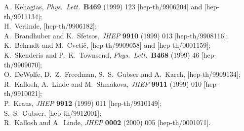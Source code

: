 \documentclass[a4paper,12pt]{article}
\begin{document}
\begin{thebibliography}{99}
%
A.~Kehagias,
{\it Phys.\ Lett.}\  {\bf B469} (1999) 123
[hep-th/9906204]
and
[hep-th/9911134];\\
%
H.~Verlinde,
[hep-th/9906182];\\
%
A.~Brandhuber and K.~Sfetsos,
{\it JHEP} {\bf 9910} (1999) 013
[hep-th/9908116];\\
%
K.~Behrndt and M.~Cveti{\v c},
[hep-th/9909058]
and
[hep-th/0001159];\\
%
K.~Skenderis and P.~K.~Townsend,
{\it Phys.\ Lett.}\  {\bf B468} (1999) 46
[hep-th/9909070];\\
%
O.~DeWolfe, D.~Z.~Freedman, S.~S.~Gubser and A.~Karch,
[hep-th/9909134];\\
%
R.~Kallosh, A.~Linde and M.~Shmakova,
{\it JHEP} {\bf 9911} (1999) 010
[hep-th/9910021];\\
%
P.~Kraus,
{\it JHEP} {\bf 9912} (1999) 011
[hep-th/9910149];\\
%
S.~S.~Gubser,
[hep-th/9912001];\\
%
R.~Kallosh and A.~Linde,
{\it JHEP} {\bf 0002} (2000) 005
[hep-th/0001071].

\end{thebibliography}
\end{document}
